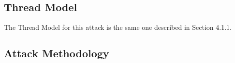 


    \subsection{Thread Model}

      The Thread Model for this attack is the same one described in Section 4.1.1.

    \subsection{Attack Methodology}

